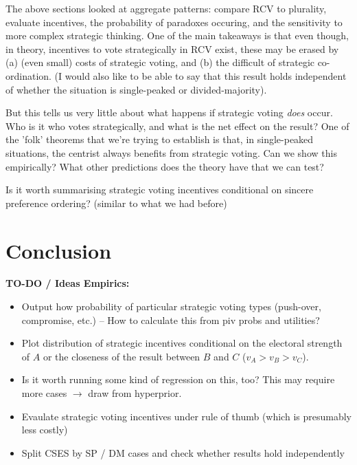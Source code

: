 \documentclass[11pt, letter, margin = 2 in]{article}
\begin{document}
The above sections looked at aggregate patterns: compare RCV to plurality, evaluate incentives, the probability of paradoxes occuring, and the sensitivity to more complex strategic thinking. One of the main takeaways is that even though, in theory, incentives to vote strategically in RCV exist, these may be erased by (a) (even small) costs of strategic voting, and (b) the difficult of strategic co-ordination. (I would also like to be able to say that this result holds independent of whether the situation is single-peaked or divided-majority).

But this tells us very little about what happens if strategic voting \textit{does} occur. Who is it who votes strategically, and what is the net effect on the result? One of the 'folk' theorems that we're trying to establish is that, in single-peaked situations, the centrist always benefits from strategic voting. Can we show this empirically? What other predictions does the theory have that we can test? 

Is it worth summarising strategic voting incentives conditional on sincere preference ordering? (similar to what we had before)

\section{Conclusion}

\textbf{TO-DO / Ideas Empirics:}

\begin{itemize}
\item Output how probability of particular strategic voting types (push-over, compromise, etc.) -- How to calculate this from piv probs and utilities?
\item Plot distribution of strategic incentives conditional on the electoral strength of $A$ or the closeness of the result between $B$ and $C$ ($v_A > v_B > v_C$).
\item Is it worth running some kind of regression on this, too? This may require more cases $\rightarrow$ draw from hyperprior.
\item Evaulate strategic voting incentives under rule of thumb (which is presumably less costly)
\item Split CSES by SP / DM cases and check whether results hold independently

\end{itemize}
\end{document}
